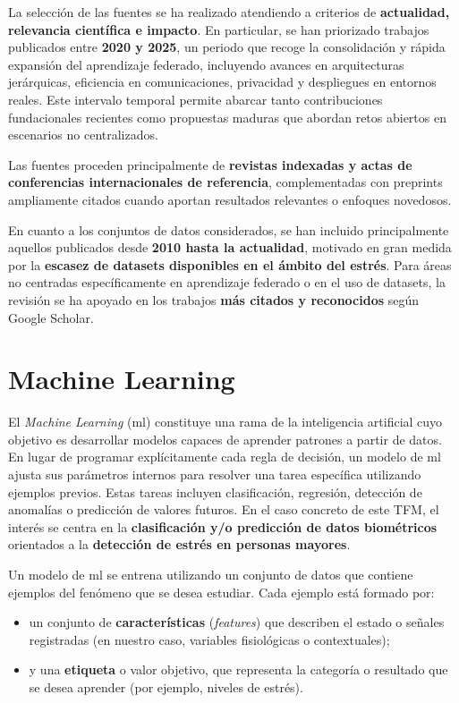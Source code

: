 \documentclass{report}
\begin{document}
La selección de las fuentes se ha realizado atendiendo a criterios de \textbf{actualidad, relevancia científica e impacto}. En particular, se han priorizado trabajos publicados entre \textbf{2020 y 2025}, un periodo que recoge la consolidación y rápida expansión del aprendizaje federado, incluyendo avances en arquitecturas jerárquicas, eficiencia en comunicaciones, privacidad y despliegues en entornos reales. Este intervalo temporal permite abarcar tanto contribuciones fundacionales recientes como propuestas maduras que abordan retos abiertos en escenarios no centralizados.

Las fuentes proceden principalmente de \textbf{revistas indexadas y actas de conferencias internacionales de referencia}, complementadas con preprints ampliamente citados cuando aportan resultados relevantes o enfoques novedosos.

En cuanto a los conjuntos de datos considerados, se han incluido principalmente aquellos publicados desde \textbf{2010 hasta la actualidad}, motivado en gran medida por la \textbf{escasez de datasets disponibles en el ámbito del estrés}. Para áreas no centradas específicamente en aprendizaje federado o en el uso de datasets, la revisión se ha apoyado en los trabajos \textbf{más citados y reconocidos} según Google Scholar.


\section{Machine Learning}

El \textit{Machine Learning} (\gls{ml}) constituye una rama de la inteligencia artificial cuyo objetivo es desarrollar modelos capaces de aprender patrones a partir de datos. En lugar de programar explícitamente cada regla de decisión, un modelo de \gls{ml} ajusta sus parámetros internos para resolver una tarea específica utilizando ejemplos previos. Estas tareas incluyen clasificación, regresión, detección de anomalías o predicción de valores futuros. En el caso concreto de este TFM, el interés se centra en la \textbf{clasificación y/o predicción de datos biométricos} orientados a la \textbf{detección de estrés en personas mayores}.

Un modelo de \gls{ml} se entrena utilizando un conjunto de datos que contiene ejemplos del fenómeno que se desea estudiar. Cada ejemplo está formado por:
\begin{itemize}
    \item un conjunto de \textbf{características} (\textit{features}) que describen el estado o señales registradas (en nuestro caso, variables fisiológicas o contextuales);
    \item y una \textbf{etiqueta} o valor objetivo, que representa la categoría o resultado que se desea aprender (por ejemplo, niveles de estrés).
\end{itemize}
\end{document}
